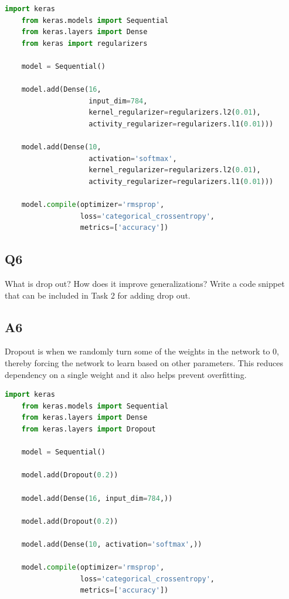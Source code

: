 \documentclass[a4paper, 12pt]{article}
\begin{document}
    \begin{lstlisting}[language=python, caption=Network with Weight Regularization]
    import keras
    from keras.models import Sequential
    from keras.layers import Dense
    from keras import regularizers
    
    model = Sequential()

    model.add(Dense(16,
                    input_dim=784,
                    kernel_regularizer=regularizers.l2(0.01),
                    activity_regularizer=regularizers.l1(0.01)))

    model.add(Dense(10,
                    activation='softmax',
                    kernel_regularizer=regularizers.l2(0.01),
                    activity_regularizer=regularizers.l1(0.01)))

    model.compile(optimizer='rmsprop',
                  loss='categorical_crossentropy',
                  metrics=['accuracy'])\end{lstlisting}

    \subsection{Q6}

    What is drop out? How does it improve generalizations? Write a code snippet that can be included in Task 2 for adding drop out.

    \subsection{A6}

    Dropout is when we randomly turn some of the weights in the network to 0, thereby forcing the network to learn based on other parameters. This reduces dependency on a single weight and it also helps prevent overfitting.

    \begin{lstlisting}[language=python, caption=Network with Dropout]
    import keras
    from keras.models import Sequential
    from keras.layers import Dense
    from keras.layers import Dropout

    model = Sequential()
    
    model.add(Dropout(0.2))

    model.add(Dense(16, input_dim=784,))

    model.add(Dropout(0.2))

    model.add(Dense(10, activation='softmax',))

    model.compile(optimizer='rmsprop',
                  loss='categorical_crossentropy',
                  metrics=['accuracy'])\end{lstlisting}
\end{document}
